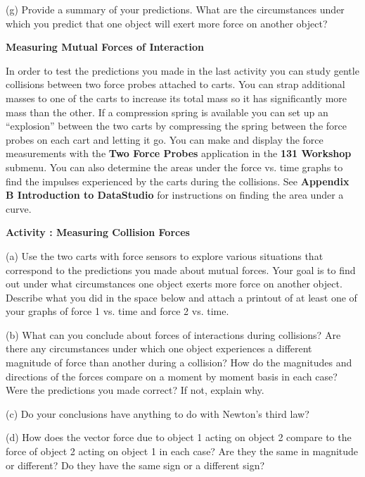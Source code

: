 (g) Provide a summary of your predictions. What are the circumstances under
which you predict that one object will exert more force on another object?
\vspace{30mm}

\textbf{Measuring Mutual Forces of Interaction }

In order to test the predictions you made in the last activity you can study
gentle collisions between two force probes attached to carts. You can strap
additional masses to one of the carts to increase its total mass so it has significantly
more mass than the other. If a compression spring is available you can set up
an ``explosion'' between the two carts by compressing the spring
between the force probes on each cart and letting it go. You can make and display the 
force measurements with the \textbf{Two Force Probes} application 
in the \textbf{131 Workshop} submenu. 
You can also determine the areas under the force vs. time graphs to find the 
impulses experienced by the carts during the collisions. 
See \textbf{Appendix B Introduction to DataStudio}
for instructions on finding the area under a curve.

\textbf{Activity : Measuring Collision Forces }

(a) Use the two carts with force sensors 
to explore various situations that correspond to the predictions
you made about mutual forces. 
Your goal is to find out under what circumstances
one object exerts more force on another object. Describe what you did in the
space below and attach a printout of at least one of your graphs of force 1
vs. time and force 2 vs. time.
\vspace{40mm}

(b) What can you conclude about forces of interactions during collisions? Are there any circumstances 
under which one object experiences a different magnitude of force
than another during a collision? How do the magnitudes and directions of the
forces compare on a moment by moment basis in each case? 
Were the predictions you made correct?
If not, explain why.

\vspace{30mm}

(c) Do your conclusions have anything to do with Newton's third law?
\vspace{20mm}

\newpage

(d) How does the vector force due to object 1 acting on object 2 compare to
the force of object 2 acting on object 1 in each case? Are they the same in
magnitude or different? Do they have the same sign or a different sign? 
\vspace{30mm}

